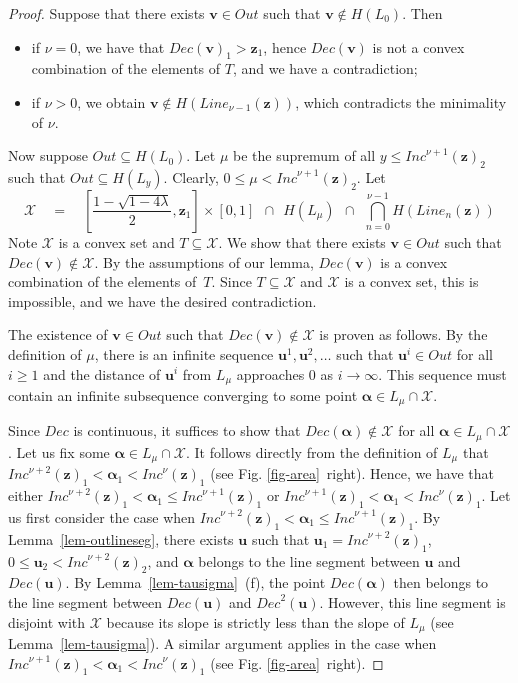 \documentclass[a4paper,UKenglish,cleveref, autoref, thm-restate]{lipics-v2021}
\newcommand{\X}{\mathcal{X}}
\newcommand{\Line}{\mathit{Line}}
\newcommand{\Out}{\mathit{Out}}
\newcommand{\INC}{\mathit{Inc}}
\newcommand{\DEC}{\mathit{Dec}}
\renewcommand{\vec}[1]{\pmb{#1}}
\begin{document}
\begin{proof}
   Suppose that there exists $\vec{v} \in \Out$ such that $\vec{v} \not\in H(L_0)$. Then
   \begin{itemize}
    \item if $\nu = 0$, we have that $\DEC(\vec{v})_1 > \vec{z}_1$, hence $\DEC(\vec{v})$ is not a convex combination of the elements of $T$, and we have a contradiction; 
    \item if $\nu > 0$, we obtain $\vec{v} \not\in H(\Line_{\nu-1}(\vec{z}))$, which contradicts the minimality of $\nu$.
   \end{itemize}
    Now suppose $\Out \subseteq H(L_0)$. Let
   $\mu$ be the supremum of all \mbox{$y \leq \INC^{\nu+1}(\vec{z})_2$} such that
    $\Out \subseteq H(L_y)$. Clearly, $0 \leq \mu < \INC^{\nu+1}(\vec{z})_2$. 
    Let 
    \[
          \X \quad = \quad \left[\textstyle\frac{1-\sqrt{1-4\lambda}}{2},\vec{z}_1\right] \times [0,1] 
           \ \ \cap \ \ H(L_\mu) \ \ \cap \ \ 
           \bigcap_{n=0}^{\nu-1} H(\Line_n(\vec{z}))
    \]
    Note $\X$ is a convex set and $T \subseteq \X$.  We show that there exists $\vec{v} \in \Out$ such that $\DEC(\vec{v}) \not\in \X$. By the 
    assumptions of our lemma, $\DEC(\vec{v})$ is a convex combination of the elements of~$T$. Since $T \subseteq \X$ and $\X$ is a convex set, this is impossible, and we have the desired contradiction.
    
    The existence of $\vec{v} \in \Out$ such that $\DEC(\vec{v}) \not\in \X$ is proven as follows. By the definition of $\mu$, there is an infinite sequence $\vec{u}^1,\vec{u}^2,\ldots$ such that $\vec{u}^i \in \Out$ for all $i \geq 1$ and the distance of $\vec{u}^i$ from $L_\mu$ approaches $0$ as $i \to \infty$.
    This sequence must contain an infinite subsequence converging to some point $\vec{\alpha} \in L_\mu \cap \X$. 
        
    Since $\DEC$ is continuous, it suffices to show that $\DEC(\vec{\alpha}) \not\in \X$ for all $\vec{\alpha} \in L_\mu \cap \X$. Let us fix some $\vec{\alpha} \in L_\mu \cap \X$. It follows directly from the definition of $L_\mu$ that $\INC^{\nu+2}(\vec{z})_1 < \vec{\alpha}_1 < \INC^{\nu}(\vec{z})_1$ (see Fig. \ref{fig-area}~right). Hence, we have that either $\INC^{\nu+2}(\vec{z})_1 < \vec{\alpha}_1 \leq \INC^{\nu+1}(\vec{z})_1$ or $\INC^{\nu+1}(\vec{z})_1 < \vec{\alpha}_1 < \INC^{\nu}(\vec{z})_1$. Let us first consider the case when $\INC^{\nu+2}(\vec{z})_1 < \vec{\alpha}_1 \leq \INC^{\nu+1}(\vec{z})_1$. By Lemma~\ref{lem-outlineseg}, there exists $\vec{u}$ such that $\vec{u}_1 = \INC^{\nu+2}(\vec{z})_1$, $0 \leq \vec{u}_2 < \INC^{\nu+2}(\vec{z})_2$, and $\vec{\alpha}$ belongs to the line segment between $\vec{u}$ and $\DEC(\vec{u})$. By Lemma~\ref{lem-tausigma}~(f), the point $\DEC(\vec{\alpha})$ then belongs to the line segment between $\DEC(\vec{u})$ and $\DEC^2(\vec{u})$. However, this line segment is disjoint with $\X$ because its slope is strictly less than the slope of $L_\mu$ (see Lemma~\ref{lem-tausigma}). A similar argument applies in the case when $\INC^{\nu+1}(\vec{z})_1 < \vec{\alpha}_1 < \INC^{\nu}(\vec{z})_1$ (see Fig. \ref{fig-area}~right).
\end{proof}
\end{document}
